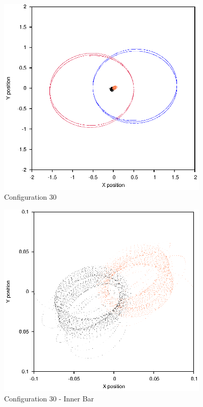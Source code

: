 \documentclass[a4paper,12pt]{article}
\begin{document}
\begin{figure}[H]
\centering
\includegraphics[width=0.9\textwidth]{./2017results/1-1-1-1/Orbit.eps}
\caption{Configuration 30}
\label{fig:config30}
\end{figure}
\begin{figure}[H]
\centering
\includegraphics[width=0.9\textwidth]{./2017results/1-1-1-1/Inner.eps}
\caption{Configuration 30 - Inner Bar}
\label{fig:config30i}
\end{figure}
\end{document}

